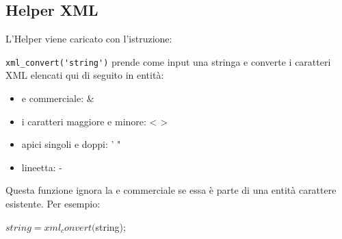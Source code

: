 \subsection{Helper XML}
\label{helper:xml}

L'Helper viene caricato con l'istruzione:


\verb|xml_convert('string')| prende come input una stringa e converte i caratteri \ac{XML} elencati qui di seguito in entità:

\begin{itemize}
\item e commerciale: &
\item i caratteri maggiore e minore: < >
\item apici singoli e doppi: '  "
\item lineetta: -
\end{itemize}

Questa funzione ignora la e commerciale se essa è parte di una entità carattere esistente. Per esempio:

\begin{code}
$string = xml_convert($string);
\end{code}